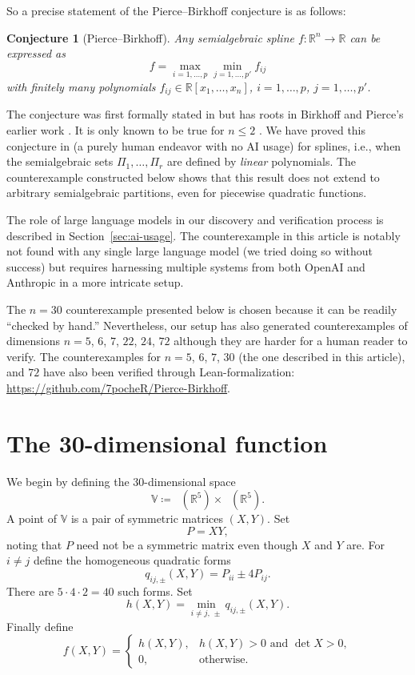 \documentclass[11pt]{amsart}
\newtheorem{conjecture}[theorem]{Conjecture}
\theoremstyle{remark}
\DeclareMathOperator{\Sym}{\mathsf{S}^2}
\begin{document}
So a precise statement of the Pierce--Birkhoff conjecture is as follows:
\begin{conjecture}[Pierce--Birkhoff]\label{conj:PB}
Any semialgebraic spline $f : \mathbb{R}^n \to \mathbb{R}$ can be expressed as
\begin{equation}\label{eq:PB}
f=\max_{i=1,\dots,p}\min_{j=1,\dots,p'} f_{ij}
\end{equation}
with finitely many polynomials $f_{ij} \in \mathbb{R}[x_1,\dots,x_n]$, $i =1,\dots,p$, $j=1,\dots,p'$.
\end{conjecture}
The conjecture was first formally stated in  \cite{HI} but has roots in Birkhoff and Pierce's earlier work \cite{BP}. It is only known to be true for $n \le 2$ \cite{Mahe1984}. We have proved this conjecture in \cite{LL} (a purely human endeavor with no AI usage) for splines, i.e., when the semialgebraic sets $\Pi_1,\dots,\Pi_r$ are defined by \emph{linear} polynomials. The counterexample constructed below shows that this result does not extend to arbitrary semialgebraic partitions, even for piecewise quadratic functions.

The role of large language models in our discovery and verification process is described in Section~\ref{sec:ai-usage}. The counterexample in this article is notably not found with any single large language model (we tried doing so without success) but requires harnessing multiple systems from both OpenAI and Anthropic in a more intricate setup.

The $n = 30$ counterexample presented below is chosen because it can be readily ``checked by hand.'' Nevertheless, our setup has also generated counterexamples of dimensions $n = 5$, $6$, $7$, $22$, $24$, $72$ although they are harder for a human reader to verify. The counterexamples for $n =5$, $6$, $7$, $30$ (the one described in this article), and $72$ have also been verified through Lean-formalization: \url{https://github.com/7pocheR/Pierce-Birkhoff}.



\section{The 30-dimensional function}

We begin by defining the $30$-dimensional space
\[
\mathbb{V} \coloneqq \Sym(\mathbb{R}^5)\times\Sym(\mathbb{R}^5).
\]
A point of $\mathbb{V}$ is a pair of symmetric matrices $(X,Y)$. Set
\[
P=XY,
\]
noting that $P$ need not be a symmetric matrix even though $X$ and $Y$ are. For $i\ne j$ define the homogeneous quadratic forms
\[
q_{ij,\pm}(X,Y)=P_{ii}\pm 4 P_{ij}.
\]
There are $5\cdot4\cdot2=40$ such forms. Set
\[
h(X,Y)=\min_{i\ne j,\, \pm}q_{ij, \pm}(X,Y).
\]
Finally define
\begin{equation}\label{eq:counterexample}
f(X,Y)=
\begin{cases}
h(X,Y),& h(X,Y)>0\text{ and }\det X>0,\\[2mm]
0,&\text{otherwise}.
\end{cases}
\end{equation}
\end{document}
